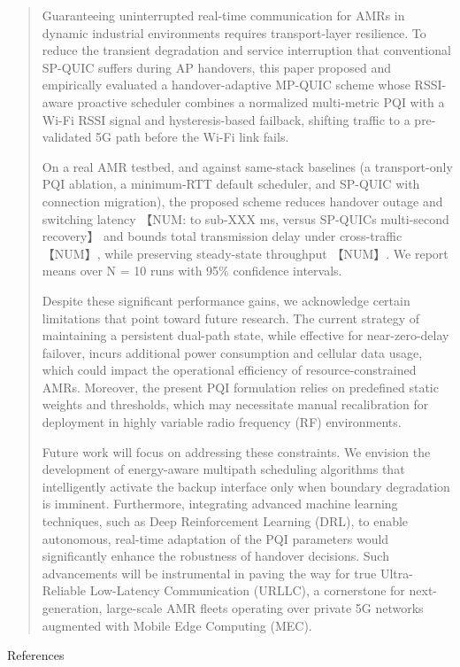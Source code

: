 \begin{quote}
Guaranteeing uninterrupted real-time communication for AMRs in dynamic industrial environments requires transport-layer resilience. To reduce the transient degradation and service interruption that conventional SP-QUIC suffers during AP handovers, this paper proposed and empirically evaluated a handover-adaptive MP-QUIC scheme whose RSSI-aware proactive scheduler combines a normalized multi-metric PQI with a Wi-Fi RSSI signal and hysteresis-based failback, shifting traffic to a pre-validated 5G path before the Wi-Fi link fails.

On a real AMR testbed, and against same-stack baselines (a transport-only PQI ablation, a minimum-RTT default scheduler, and SP-QUIC with connection migration), the proposed scheme reduces handover outage and switching latency 【NUM: to sub-XXX ms, versus SP-QUIC\textquotesingle s multi-second recovery】 and bounds total transmission delay under cross-traffic 【NUM】, while preserving steady-state throughput 【NUM】. We report means over N = 10 runs with 95\% confidence intervals.

Despite these significant performance gains, we acknowledge certain limitations that point toward future research. The current strategy of maintaining a persistent dual-path state, while effective for near-zero-delay failover, incurs additional power consumption and cellular data usage, which could impact the operational efficiency of resource-constrained AMRs. Moreover, the present PQI formulation relies on predefined static weights and thresholds, which may necessitate manual recalibration for deployment in highly variable radio frequency (RF) environments.

Future work will focus on addressing these constraints. We envision the development of energy-aware multipath scheduling algorithms that intelligently activate the backup interface only when boundary degradation is imminent. Furthermore, integrating advanced machine learning techniques, such as Deep Reinforcement Learning (DRL), to enable autonomous, real-time adaptation of the PQI parameters would significantly enhance the robustness of handover decisions. Such advancements will be instrumental in paving the way for true Ultra-Reliable Low-Latency Communication (URLLC), a cornerstone for next-generation, large-scale AMR fleets operating over private 5G networks augmented with Mobile Edge Computing (MEC).
\end{quote}

References

